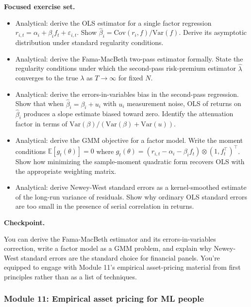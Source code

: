 \textbf{Focused exercise set.}

\begin{itemize}
\tightlist
\item
  Analytical: derive the OLS estimator for a single factor regression
  \(r_{i,t} = \alpha_i + \beta_i f_t + \varepsilon_{i,t}\). Show
  \(\hat{\beta}_i = \text{Cov}(r_i, f) / \text{Var}(f)\). Derive its
  asymptotic distribution under standard regularity conditions.
\item
  Analytical: derive the Fama-MacBeth two-pass estimator formally. State
  the regularity conditions under which the second-pass risk-premium
  estimator \(\hat{\lambda}\) converges to the true \(\lambda\) as
  \(T \to \infty\) for fixed \(N\).
\item
  Analytical: derive the errors-in-variables bias in the second-pass
  regression. Show that when \(\hat{\beta}_i = \beta_i + u_i\) with
  \(u_i\) measurement noise, OLS of returns on \(\hat{\beta}_i\)
  produces a slope estimate biased toward zero. Identify the attenuation
  factor in terms of
  \(\text{Var}(\beta) / (\text{Var}(\beta) + \text{Var}(u))\).
\item
  Analytical: derive the GMM objective for a factor model. Write the
  moment conditions \(\mathbb{E}[g_t(\theta)] = 0\) where
  \(g_t(\theta) = (r_{i,t} - \alpha_i - \beta_i f_t) \otimes (1, f_t^\top)^\top\).
  Show how minimizing the sample-moment quadratic form recovers OLS with
  the appropriate weighting matrix.
\item
  Analytical: derive Newey-West standard errors as a kernel-smoothed
  estimate of the long-run variance of residuals. Show why ordinary OLS
  standard errors are too small in the presence of serial correlation in
  returns.
\end{itemize}

\textbf{Checkpoint.}

You can derive the Fama-MacBeth estimator and its errors-in-variables
correction, write a factor model as a GMM problem, and explain why
Newey-West standard errors are the standard choice for financial panels.
You're equipped to engage with Module 11's empirical asset-pricing
material from first principles rather than as a list of techniques.

\subsubsection{Module 11: Empirical asset pricing for ML
people}\label{module-11-empirical-asset-pricing-for-ml-people}

